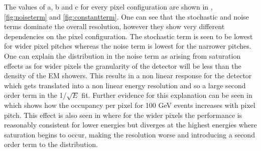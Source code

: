 The values of a, b and c for every pixel configuration are shown in , \ref{fig:noiseterm} and \ref{fig:constantterm}. One can see that the stochastic and noise terms dominate the overall resolution, however they show very different dependencies on the pixel configuration. The stochastic term is seen to be lowest for wider pixel pitches whereas the noise term is lowest for the narrower pitches. One can explain the distribution in the noise term as arising from saturation effects as for wider pixels the granularity of the detector will be less than the density of the EM showers. This results in a non linear response for the detector which gets translated into a non linear energy resolution and so a large second order term in the 1/$\sqrt{E}$ fit. Further evidence for this explanation can be seen in  which shows how the occupancy per pixel for 100 GeV events increases with pixel pitch. This effect is also seen in  where for the wider pixels the performance is reasonably consistent for lower energies but diverges at the highest energies where saturation begins to occur, making the resolution worse and introducing a second order term to the distribution.

